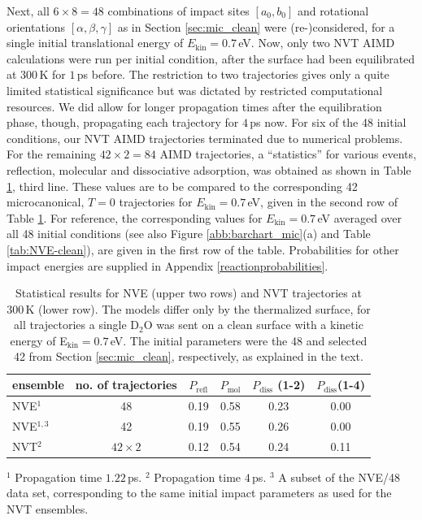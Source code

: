 \documentclass[11pt,DIV=13,BCOR=5mm,a4paper,headinclude]{scrbook}
\begin{document}
Next, all $6\times 8=48$ combinations of impact sites $[a_0,b_0]$ and rotational orientations  $[\alpha,\beta,\gamma]$ as in Section \ref{sec:mic_clean} were (re-)considered, for a single initial translational energy of $E_\textrm{kin}=0.7\,$eV.
Now, only two NVT AIMD calculations were run per initial condition, after the surface had been equilibrated at $300\,$K for $1\,$ps before.
The restriction to two trajectories gives only a quite limited statistical significance but was dictated by restricted computational resources.
We did allow for longer propagation times after the equilibration phase, though, propagating  each trajectory for $4\,$ps now.
For six of the 48 initial conditions, our NVT AIMD trajectories terminated due to numerical problems.
For the remaining $42\times2=84$ AIMD trajectories, a ``statistics'' for various events, reflection, molecular and dissociative adsorption, was obtained as shown in Table \ref{tab:nvt-nve_comp}, third line.
These values are to be compared to the corresponding 42 microcanonical, $T=0$ trajectories for $E_\textrm{kin}=0.7\,$eV, given in the second row of Table \ref{tab:nvt-nve_comp}.
For reference, the corresponding values for $E_\textrm{kin}=0.7\,$eV averaged over all 48 initial conditions (see also Figure \ref{abb:barchart_mic}(a) and Table \ref{tab:NVE-clean}), are given in the first row of the table.
Probabilities for other impact energies are supplied in Appendix \ref{reactionprobabilities}.
\\
\begin{table}[!h]
 \centering
 \caption{Statistical results for NVE (upper two rows) and NVT trajectories at $300\,$K (lower row).
The models differ only by the thermalized surface, for all trajectories a single D$_2$O was sent on a clean surface with a kinetic energy of E$_\textrm{kin}=0.7\,$eV.
The initial parameters were the 48 and selected 42 from Section \ref{sec:mic_clean}, respectively, as explained in the text.}
\vspace*{.2cm}
  \begin{tabular}{lc|cccc}
 \toprule
  ensemble & no.
of trajectories & $P_\textrm{refl}$ & $P_\textrm{mol}$ & $P_\textrm{diss}$ (1-2) & $P_\textrm{diss}$(1-4) 
 \\\midrule
 NVE$^1$         & 48 & 0.19 & 0.58 & 0.23 & 0.00 \\
 NVE$^{1,3}$     & 42 & 0.19 & 0.55 & 0.26 & 0.00 \\
 NVT$^2$ &$42\times 2$& 0.12 & 0.54 & 0.24 & 0.11 \\\bottomrule
  \end{tabular}
\begin{tablenotes}
 \footnotesize
\item[] $^1$ Propagation time $1.22\,$ps.
$^2$ Propagation time $4\,$ps.
$^3$ A subset of the NVE/48 data set,  corresponding to the same initial impact parameters as used for the NVT ensembles.
\end{tablenotes}
\label{tab:nvt-nve_comp}
\end{table}
\end{document}

